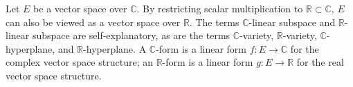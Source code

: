 Let $E$ be a vector space over $\mathbb{C}$. By restricting scalar multiplication to $\mathbb{R} \subset \mathbb{C}$, $E$ can also be viewed as a vector space over $\mathbb{R}$. The terms $\mathbb{C}$-linear subspace and $\mathbb{R}$-linear subspace are self-explanatory, as are the terms $\mathbb{C}$-variety, $\mathbb{R}$-variety, $\mathbb{C}$-hyperplane, and $\mathbb{R}$-hyperplane. A $\mathbb{C}$-form is a linear form $f: E \to \mathbb{C}$ for the complex vector space structure; an $\mathbb{R}$-form is a linear form $g: E \to \mathbb{R}$ for the real vector space structure.
